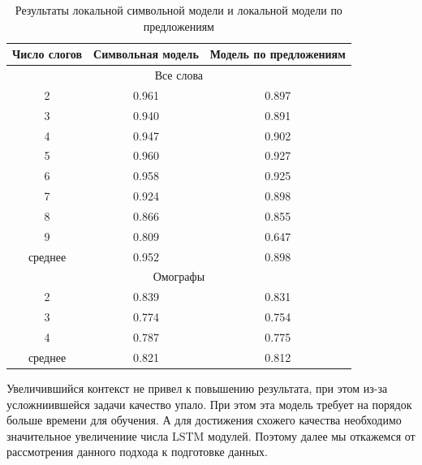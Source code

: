 \documentclass[14pt, a4paper, russian]{extreport}
\begin{document}
\begin{table}[H]
		\caption{Результаты локальной символьной модели и локальной модели по предложениям}
	\begin{small}
		\begin{center}
			\begin{tabular}{|c|c|c|}
				\hline
				Число слогов & Символьная модель & Модель по предложениям \\ \hline
				\multicolumn{3}{|c|}{Все слова}                          \\ \hline
				     2       &      0.961       &         0.897          \\ \hline
				     3       &      0.940       &         0.891          \\ \hline
				     4       &      0.947       &         0.902          \\ \hline
				     5       &      0.960       &         0.927          \\ \hline
				     6       &      0.958       &         0.925          \\ \hline
				     7       &      0.924       &         0.898          \\ \hline
				     8       &      0.866       &         0.855          \\ \hline
				     9       &      0.809       &         0.647          \\ \hline
				  среднее    &      0.952       &         0.898          \\ \hline
				\multicolumn{3}{|c|}{Омографы}                           \\ \hline
				     2       &      0.839       &         0.831          \\ \hline
				     3       &      0.774       &         0.754          \\ \hline
				     4       &      0.787       &         0.775          \\ \hline
				  среднее    &      0.821       &         0.812          \\ \hline
			\end{tabular}
		\end{center}
	\end{small}

	\label{table:local_sent}
\end{table}

Увеличившийся контекст не привел к повышению результата, при этом из-за усложниившейся задачи качество упало. При этом эта модель требует на порядок больше времени для обучения. А для достижения схожего качества необходимо значительное увеличениие числа LSTM модулей. Поэтому далее мы откажемся от рассмотрения данного подхода к подготовке данных.
\end{document}
